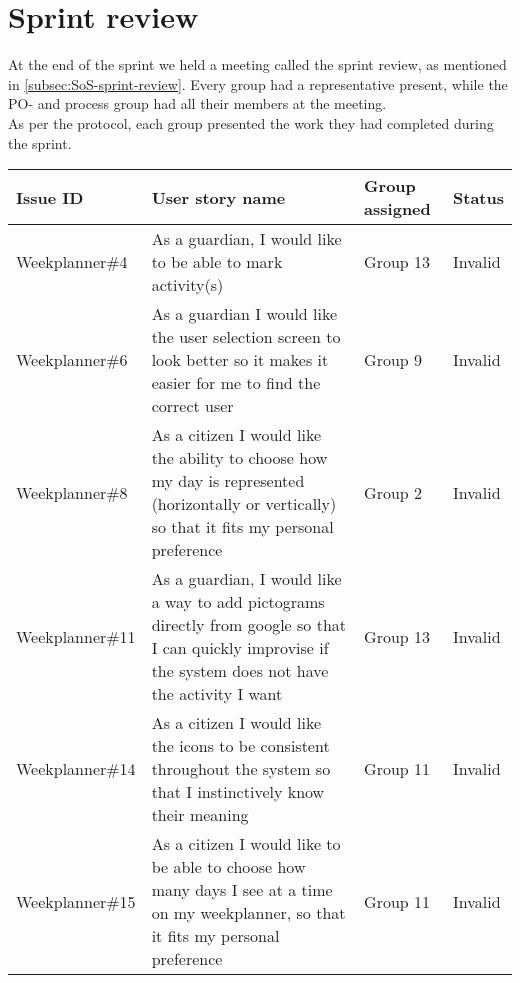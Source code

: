 \section{Sprint review}
At the end of the sprint we held a meeting called the sprint review, as mentioned in \autoref{subsec:SoS-sprint-review}.
Every group had a representative present, while the PO- and process group had all their members at the meeting.
\\
As per the protocol, each group presented the work they had completed during the sprint.
\begin{table}[!ht]
    \begin{tabular}{|p{2.8cm}|p{7cm}|p{2cm}|p{1.5cm}|}
    \hline
    Issue ID        & User story name                                                                                                                                                          & Group assigned  & Status     \\ \hline
    Weekplanner\#4  & As a guardian, I would like to be able to mark activity(s)                                                                                                               & Group 13        & Invalid    \\ \hline
    Weekplanner\#6  & As a guardian I would like the user selection screen to look better so it makes it easier for me to find the correct user                                                & Group 9         & Invalid    \\ \hline
    Weekplanner\#8  & As a citizen I would like the ability to choose how my day is represented (horizontally or vertically) so that it fits my personal preference                            & Group 2         & Invalid    \\ \hline
    Weekplanner\#11 & As a guardian, I would like a way to add pictograms directly from google so that I can quickly improvise if the system does not have the activity I want                 & Group 13        & Invalid    \\ \hline
    Weekplanner\#14 & As a citizen I would like the icons to be consistent throughout the system so that I instinctively know their meaning                                                    & Group 11        & Invalid    \\ \hline
    Weekplanner\#15 & As a citizen I would like to be able to choose how many days I see at a time on my weekplanner, so that it fits my personal preference                                   & Group 11        & Invalid    \\ \hline

\end{tabular}
\end{table}
